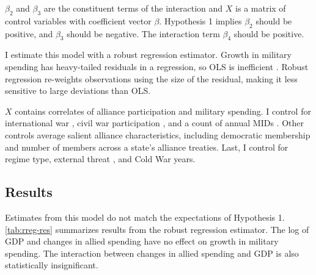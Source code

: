 \documentclass[12pt]{article}
\begin{document}
$\beta_2$ and $\beta_3$ are the constituent terms of the interaction and \textbf{$X$} is a matrix of control variables with coefficient vector $\beta$.
Hypothesis 1 implies $\beta_2$ should be positive, and $\beta_3$ should be negative. 
The interaction term $\beta_4$ should be positive. 


I estimate this model with a robust regression estimator. 
Growth in military spending has heavy-tailed residuals in a regression, so OLS is inefficient \citep{RaineyBaissa2018}. 
Robust regression re-weights observations using the size of the residual, making it less sensitive to large deviations than OLS. 


\textbf{$X$} contains correlates of alliance participation and military spending. 
I control for international war \citep{Reiteretal2016}, civil war participation \citep{SarkeesWayman2010}, and a count of annual MIDs \citep{Gibleretal2016}. 
Other controls average salient alliance characteristics, including democratic membership \citep{DigiuseppePoast2016} and number of members across a state's alliance treaties.   
Last, I control for regime type, external threat \citep{LeedsSavun2007}, and Cold War years. 


\subsection{Results}


Estimates from this model do not match the expectations of Hypothesis 1. 
\autoref{tab:rreg-res} summarizes results from the robust regression estimator. 
The log of GDP and changes in allied spending have no effect on growth in military spending. 
The interaction between changes in allied spending and GDP is also statistically insignificant. 
\end{document}
